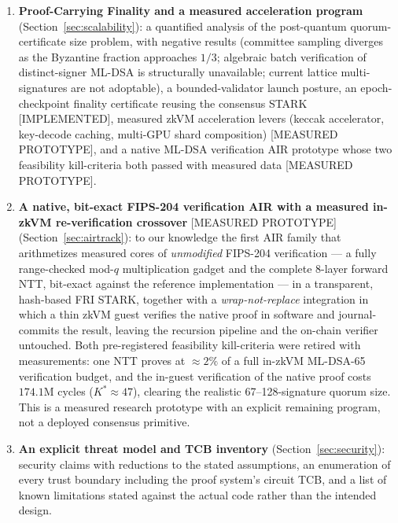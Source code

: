 \documentclass[11pt]{article}
\newcommand{\code}[1]{\texttt{#1}}
\newcommand{\mldsa}{ML\mbox{-}DSA\mbox{-}65}
\newcommand{\statusI}{\textcolor{statgreen}{\textsf{\scriptsize[IMPLEMENTED]}}}
\newcommand{\statusP}{\textcolor{statblue}{\textsf{\scriptsize[IN PROGRESS]}}}
\newcommand{\statusM}{\textcolor{statblue}{\textsf{\scriptsize[MEASURED PROTOTYPE]}}}
\theoremstyle{plain}
\theoremstyle{definition}
\theoremstyle{remark}
\begin{document}
\begin{enumerate}[leftmargin=1.6em]
  FIPS-204 stake-weighted quorum certificate ($\approx$5.87M zkVM cycles per
  signature, measured), composed with Merkle transaction-inclusion proofs in a
  batch guest whose committed journal is the exact ABI encoding that the
  on-chain \code{SOSBridge} contract reconstructs and verifies against a
  pinned, immutable program identity; for Ethereum$\to$SOS, a finality and
  execution-storage proof that extracts the wSOS burn under verified
  sync-committee roots. Both directions, the unattended relayer,
  and a public validator-set rotation from $V_0$ to $V_1$ have been demonstrated
  end-to-end against live Ethereum Sepolia with real proofs \statusI{};
  sustained cross-chain load/chaos exercise and external review remain
  \statusP{}.
\item \textbf{Proof-Carrying Finality and a measured acceleration program}
  (Section~\ref{sec:scalability}): a quantified analysis of the post-quantum
  quorum-certificate size problem, with negative results (committee sampling
  diverges as the Byzantine fraction approaches $1/3$; algebraic batch
  verification of distinct-signer ML-DSA is structurally unavailable; current
  lattice multi-signatures are not adoptable), a bounded-validator launch
  posture, an epoch-checkpoint finality certificate reusing the consensus
  STARK \statusI{}, measured zkVM acceleration levers (keccak accelerator,
  key-decode caching, multi-GPU shard composition) \statusM{}, and a native
  ML-DSA verification AIR prototype whose two feasibility kill-criteria both
  passed with measured data \statusM{}.
\item \textbf{A native, bit-exact FIPS-204 verification AIR with a measured
  in-zkVM re-verification crossover} \statusM{} (Section~\ref{sec:airtrack}):
  to our knowledge the first AIR family that arithmetizes measured cores of
  \emph{unmodified} FIPS-204 verification --- a fully range-checked mod-$q$
  multiplication gadget and the complete 8-layer forward NTT, bit-exact
  against the reference implementation --- in a transparent, hash-based FRI
  STARK, together with a \emph{wrap-not-replace} integration in which a thin
  zkVM guest verifies the native proof in software and journal-commits the
  result, leaving the recursion pipeline and the on-chain verifier untouched.
  Both pre-registered feasibility kill-criteria were retired with
  measurements: one NTT proves at $\approx 2\%$ of a full in-zkVM \mldsa{}
  verification budget, and the in-guest verification of the native proof
  costs $174.1$M cycles ($K^\ast \approx 47$), clearing the realistic
  67--128-signature quorum size. This is a measured research prototype with
  an explicit remaining program, not a deployed consensus primitive.
\item \textbf{An explicit threat model and TCB inventory}
  (Section~\ref{sec:security}): security claims with reductions to the stated
  assumptions, an enumeration of every trust boundary including the proof
  system's circuit TCB, and a list of known
  limitations stated against the actual code rather than the intended design.
\end{enumerate}
\end{document}
